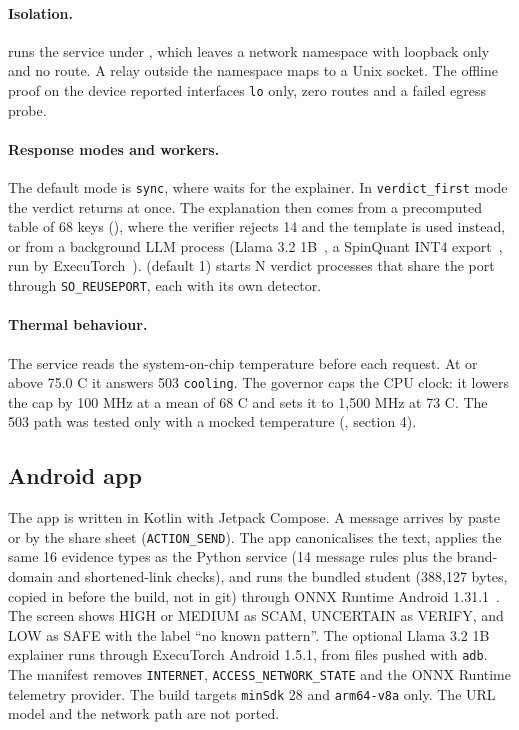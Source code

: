 \paragraph{Isolation.}  runs the service under , which leaves a network namespace with loopback only and no route. A relay outside the namespace maps  to a Unix socket. The offline proof on the device reported interfaces \texttt{lo} only, zero routes and a failed egress probe\prose.

\paragraph{Response modes and workers.} The default mode is \texttt{sync}, where  waits for the explainer. In \texttt{verdict\_first} mode the verdict returns at once. The explanation then comes from a precomputed table of 68 keys (), where the verifier rejects 14 and the template is used instead, or from a background LLM process (Llama 3.2 1B~\cite{llama32}, a SpinQuant INT4 export~\cite{spinquant,etcommunity}, run by ExecuTorch~\cite{executorch}).  (default 1) starts N verdict processes that share the port through \texttt{SO\_REUSEPORT}, each with its own detector.

\paragraph{Thermal behaviour.} The service reads the system-on-chip temperature before each request. At or above 75.0 \textdegree C it answers 503 \texttt{cooling}. The governor  caps the CPU clock: it lowers the cap by 100 MHz at a mean of 68 \textdegree C and sets it to 1,500 MHz at 73 \textdegree C. The 503 path was tested only with a mocked temperature (, section 4).

\subsection{Android app}

The app is written in Kotlin with Jetpack Compose. A message arrives by paste or by the share sheet (\texttt{ACTION\_SEND}). The app canonicalises the text, applies the same 16 evidence types as the Python service (14 message rules plus the brand-domain and shortened-link checks), and runs the bundled student (388,127 bytes, copied in before the build, not in git) through ONNX Runtime Android 1.31.1~\cite{onnxruntime}. The screen shows HIGH or MEDIUM as SCAM, UNCERTAIN as VERIFY, and LOW as SAFE with the label ``no known pattern''. The optional Llama 3.2 1B explainer runs through ExecuTorch Android 1.5.1, from files pushed with \texttt{adb}. The manifest removes \texttt{INTERNET}, \texttt{ACCESS\_NETWORK\_STATE} and the ONNX Runtime telemetry provider. The build targets \texttt{minSdk} 28 and \texttt{arm64-v8a} only. The URL model and the network path are not ported.

